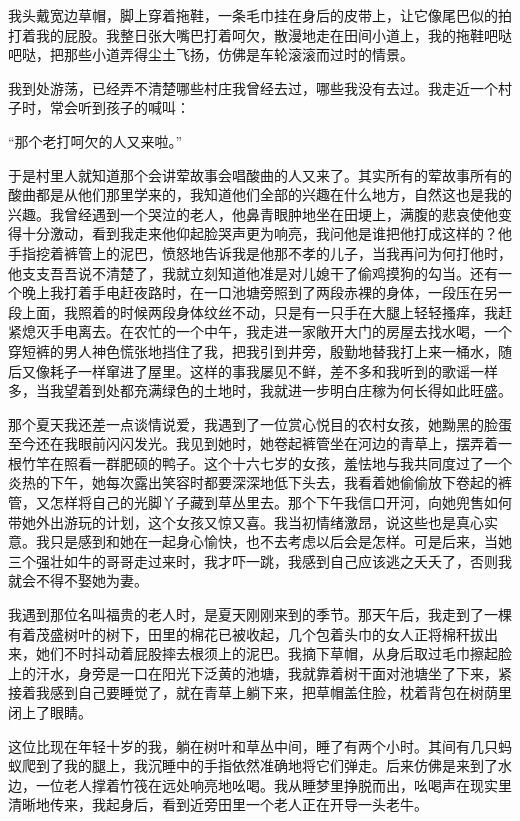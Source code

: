 \documentclass[12pt,UTF8]{ctexbook}
\begin{document}
我头戴宽边草帽，脚上穿着拖鞋，一条毛巾挂在身后的皮带上，让它像尾巴似的拍打着我的屁股。我整日张大嘴巴打着呵欠，散漫地走在田间小道上，我的拖鞋吧哒吧哒，把那些小道弄得尘土飞扬，仿佛是车轮滚滚而过时的情景。

我到处游荡，已经弄不清楚哪些村庄我曾经去过，哪些我没有去过。我走近一个村子时，常会听到孩子的喊叫：

“那个老打呵欠的人又来啦。”

于是村里人就知道那个会讲荤故事会唱酸曲的人又来了。其实所有的荤故事所有的酸曲都是从他们那里学来的，我知道他们全部的兴趣在什么地方，自然这也是我的兴趣。我曾经遇到一个哭泣的老人，他鼻青眼肿地坐在田埂上，满腹的悲哀使他变得十分激动，看到我走来他仰起脸哭声更为响亮，我问他是谁把他打成这样的？他手指挖着裤管上的泥巴，愤怒地告诉我是他那不孝的儿子，当我再问为何打他时，他支支吾吾说不清楚了，我就立刻知道他准是对儿媳干了偷鸡摸狗的勾当。还有一个晚上我打着手电赶夜路时，在一口池塘旁照到了两段赤裸的身体，一段压在另一段上面，我照着的时候两段身体纹丝不动，只是有一只手在大腿上轻轻搔痒，我赶紧熄灭手电离去。在农忙的一个中午，我走进一家敞开大门的房屋去找水喝，一个穿短裤的男人神色慌张地挡住了我，把我引到井旁，殷勤地替我打上来一桶水，随后又像耗子一样窜进了屋里。这样的事我屡见不鲜，差不多和我听到的歌谣一样多，当我望着到处都充满绿色的土地时，我就进一步明白庄稼为何长得如此旺盛。

那个夏天我还差一点谈情说爱，我遇到了一位赏心悦目的农村女孩，她黝黑的脸蛋至今还在我眼前闪闪发光。我见到她时，她卷起裤管坐在河边的青草上，摆弄着一根竹竿在照看一群肥硕的鸭子。这个十六七岁的女孩，羞怯地与我共同度过了一个炎热的下午，她每次露出笑容时都要深深地低下头去，我看着她偷偷放下卷起的裤管，又怎样将自己的光脚丫子藏到草丛里去。那个下午我信口开河，向她兜售如何带她外出游玩的计划，这个女孩又惊又喜。我当初情绪激昂，说这些也是真心实意。我只是感到和她在一起身心愉快，也不去考虑以后会是怎样。可是后来，当她三个强壮如牛的哥哥走过来时，我才吓一跳，我感到自己应该逃之夭夭了，否则我就会不得不娶她为妻。

我遇到那位名叫福贵的老人时，是夏天刚刚来到的季节。那天午后，我走到了一棵有着茂盛树叶的树下，田里的棉花已被收起，几个包着头巾的女人正将棉秆拔出来，她们不时抖动着屁股摔去根须上的泥巴。我摘下草帽，从身后取过毛巾擦起脸上的汗水，身旁是一口在阳光下泛黄的池塘，我就靠着树干面对池塘坐了下来，紧接着我感到自己要睡觉了，就在青草上躺下来，把草帽盖住脸，枕着背包在树荫里闭上了眼睛。

这位比现在年轻十岁的我，躺在树叶和草丛中间，睡了有两个小时。其间有几只蚂蚁爬到了我的腿上，我沉睡中的手指依然准确地将它们弹走。后来仿佛是来到了水边，一位老人撑着竹筏在远处响亮地吆喝。我从睡梦里挣脱而出，吆喝声在现实里清晰地传来，我起身后，看到近旁田里一个老人正在开导一头老牛。
\end{document}
